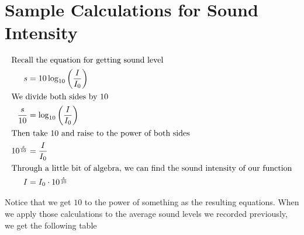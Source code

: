 \documentclass[index]{subfiles}
\begin{document}
\section{Sample Calculations for Sound Intensity}

\begin{align*}
    \intertext{Recall the equation for getting sound level}
    s                 & =10\log_{10}\left(\frac{I}{I_{0}}\right) \\
    \intertext{We divide both sides by 10}
    \frac{s}{10}      & =\log_{10}\left(\frac{I}{I_{0}}\right)   \\
    \intertext{Then take 10 and raise to the power of both sides}
    10^{\frac{s}{10}} & =\frac{I}{I_{0}}                         \\
    \intertext{Through a little bit of algebra, we can find the sound intensity of our function}
    I                 & =I_{0}\cdot10^{\frac{s}{10}}
\end{align*}

Notice that we get \(10\) to the power of something as the resulting equations. When we apply those calculations to the average sound levels we recorded previously, we get the following table
\end{document}
